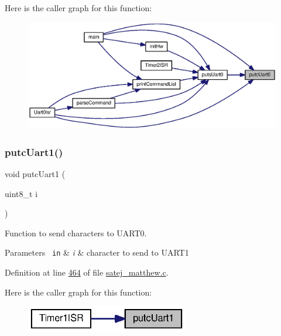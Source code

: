 Here is the caller graph for this function\+:
\nopagebreak
\begin{figure}[H]
\begin{center}
\leavevmode
\includegraphics[width=350pt]{satej__matthew_8c_a27ebab6950bfb65d641dd04feb03906f_icgraph}
\end{center}
\end{figure}
\mbox{\label{satej__matthew_8c_a6c61bcdd147e256a7e6b05b34fb783bc}} 
\subsubsection{\texorpdfstring{putcUart1()}{putcUart1()}}
{\footnotesize\ttfamily void putc\+Uart1 (\begin{DoxyParamCaption}\item[{uint8\+\_\+t}]{i }\end{DoxyParamCaption})}



Function to send characters to U\+A\+R\+T0. 


\begin{DoxyParams}[1]{Parameters}
\mbox{\texttt{ in}}  & {\em i} & character to send to U\+A\+R\+T1 \\
\hline
\end{DoxyParams}


Definition at line \mbox{\hyperlink{satej__matthew_8c_source_l00464}{464}} of file \mbox{\hyperlink{satej__matthew_8c_source}{satej\+\_\+matthew.\+c}}.

Here is the caller graph for this function\+:
\nopagebreak
\begin{figure}[H]
\begin{center}
\leavevmode
\includegraphics[width=201pt]{satej__matthew_8c_a6c61bcdd147e256a7e6b05b34fb783bc_icgraph}
\end{center}
\end{figure}
\mbox{\label{satej__matthew_8c_af4adb618930ee1a928705aec083cf726}} 
